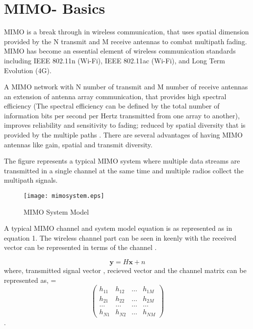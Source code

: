 
\section{MIMO- Basics}

\ac{MIMO} is a break through in wireless communication, that uses spatial dimension provided by the N transmit and M receive antennas to combat multipath fading. \ac{MIMO} has become an essential element of wireless communication standards including IEEE 802.11n (Wi-Fi), IEEE 802.11ac (Wi-Fi), and Long Term Evolution (4G).

A \acs{MIMO} network with N number of transmit and M number of receive antennas an extension of antenna array communication, that provides high spectral efficiency (The spectral efficiency can be defined by the total number of information bits per second per Hertz transmitted from one array to another), improves reliability and sensitivity to fading; reduced by spatial diversity that is provided by the multiple paths . There are several advantages of having \acs{MIMO} antennas like gain, spatial and transmit diversity. 

The figure represents a typical \ac{MIMO} system where multiple data streams are  transmitted in a single channel at the same time and multiple radios collect the multipath signals.

\begin{figure}[h]
	\begin{center}
		\texttt{[image: mimosystem.eps]}
		\caption{MIMO System Model}
	\end{center}
\end{figure}


A typical \ac{MIMO} channel and system model equation is as represented as in equation 1. The wireless channel part can be seen in keenly with the received vector  can be represented in terms of the channel . 

\begin{equation}
\mathbf{y} = H \mathbf{x} + n
\label{bgmimo1_eqn}
\end{equation}
where, transmitted signal vector , recieved vector  and the channel matrix can be represented as,  =  \[ \left( \begin{array}{cccc} 
h_{11} & h_{12} & \dotsc & h_{1M} \\
h_{21} & h_{22} & \dotsc & h_{2M} \\
\dotsc & \dotsc & \dotsc & \dotsc \\
h_{N1} & h_{N2} & \dotsc & h_{NM} \end{array} \right)\].

